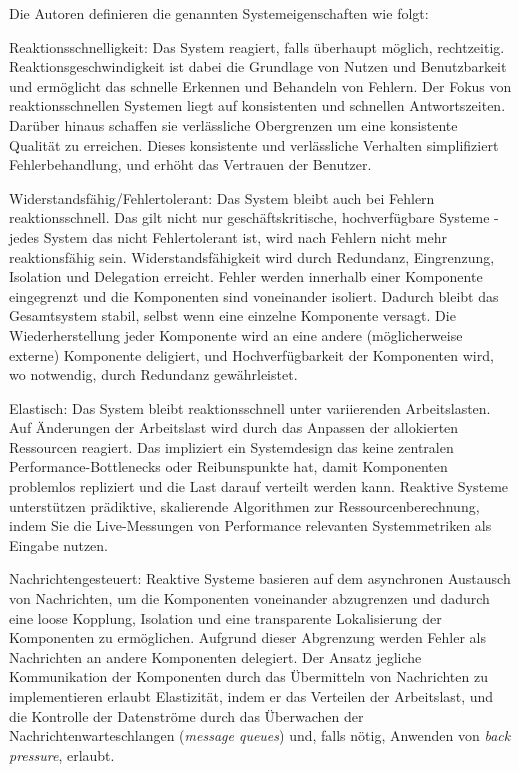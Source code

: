 Die Autoren definieren die genannten Systemeigenschaften wie folgt:

Reaktionsschnelligkeit: Das System reagiert, falls überhaupt möglich, rechtzeitig. Reaktionsgeschwindigkeit ist dabei die Grundlage von Nutzen und
Benutzbarkeit und ermöglicht das schnelle Erkennen und Behandeln von Fehlern.
Der Fokus von reaktionsschnellen Systemen liegt auf konsistenten und schnellen Antwortszeiten. Darüber hinaus schaffen sie
verlässliche Obergrenzen um eine konsistente Qualität zu erreichen.
Dieses konsistente und verlässliche Verhalten simplifiziert Fehlerbehandlung, und erhöht das Vertrauen der Benutzer.

Widerstandsfähig/Fehlertolerant: Das System bleibt auch bei Fehlern reaktionsschnell. Das gilt nicht nur geschäftskritische, hochverfügbare Systeme -
jedes System das nicht Fehlertolerant ist, wird nach Fehlern nicht mehr reaktionsfähig sein.
Widerstandsfähigkeit wird durch Redundanz, Eingrenzung, Isolation und Delegation erreicht.
Fehler werden innerhalb einer Komponente eingegrenzt und die Komponenten sind voneinander isoliert. Dadurch bleibt das Gesamtsystem stabil, selbst
wenn eine einzelne Komponente versagt.
Die Wiederherstellung jeder Komponente wird an eine andere (möglicherweise externe) Komponente deligiert, und
Hochverfügbarkeit der Komponenten wird, wo notwendig, durch Redundanz gewährleistet.

Elastisch: Das System bleibt reaktionsschnell unter variierenden Arbeitslasten. Auf Änderungen der Arbeitslast wird durch das Anpassen der
allokierten Ressourcen reagiert. Das impliziert ein Systemdesign das keine zentralen Performance-Bottlenecks oder Reibunspunkte hat, damit
Komponenten problemlos repliziert und die Last darauf verteilt werden kann.
Reaktive Systeme unterstützen prädiktive, skalierende Algorithmen zur Ressourcenberechnung,
indem Sie die Live-Messungen von Performance relevanten Systemmetriken als Eingabe nutzen.

Nachrichtengesteuert: Reaktive Systeme basieren auf dem asynchronen Austausch von Nachrichten, um die Komponenten voneinander abzugrenzen und dadurch
eine loose Kopplung, Isolation und eine transparente Lokalisierung der Komponenten zu ermöglichen.
Aufgrund dieser Abgrenzung werden Fehler als Nachrichten an andere Komponenten delegiert.
Der Ansatz jegliche Kommunikation der Komponenten durch das Übermitteln von Nachrichten zu implementieren erlaubt Elastizität,
indem er das Verteilen der Arbeitslast, und die Kontrolle der Datenströme durch das Überwachen der Nachrichtenwarteschlangen
(\textit{message queues}) und, falls nötig, Anwenden von \textit{back pressure}, erlaubt.\parencite{ReactiveSystems}

